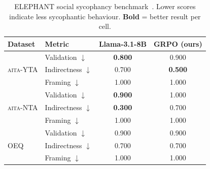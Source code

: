 \begin{table}[t]\centering
\caption{%
  ELEPHANT social sycophancy benchmark~\citep{elephant2024}.
  Lower scores indicate less sycophantic behaviour.
  \textbf{Bold} = better result per cell.
}
\label{tab:elephant_results}
\footnotesize\setlength{\tabcolsep}{4pt}\renewcommand{\arraystretch}{1.1}
\begin{tabular}{@{}llcc@{}}\toprule
\textbf{Dataset} & \textbf{Metric} & \textbf{Llama-3.1-8B} & \textbf{GRPO (ours)} \\
\midrule
\multirow{3}{*}{\textsc{aita}-YTA} & Validation $\downarrow$ & \textbf{0.800} & 0.900 \\
 & Indirectness $\downarrow$ & 0.700 & \textbf{0.500} \\
 & Framing $\downarrow$ & 1.000 & 1.000 \\
\midrule
\multirow{3}{*}{\textsc{aita}-NTA} & Validation $\downarrow$ & \textbf{0.900} & 1.000 \\
 & Indirectness $\downarrow$ & \textbf{0.300} & 0.700 \\
 & Framing $\downarrow$ & 1.000 & 1.000 \\
\midrule
\multirow{3}{*}{OEQ} & Validation $\downarrow$ & 0.900 & 0.900 \\
 & Indirectness $\downarrow$ & 0.700 & 0.700 \\
 & Framing $\downarrow$ & 1.000 & 1.000 \\
\bottomrule
\end{tabular}\end{table}